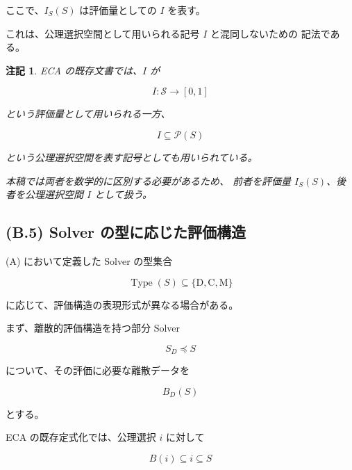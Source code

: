 \documentclass[a4paper,11pt]{article}
\newtheorem{remark}[definition]{注記}
\newcommand{\Solver}{\mathcal{S}}
\newcommand{\SubSolver}{\preceq}
\newcommand{\Type}{\operatorname{Type}}
\newcommand{\DType}{\mathrm{D}}
\newcommand{\CType}{\mathrm{C}}
\newcommand{\MType}{\mathrm{M}}
\begin{document}
ここで、$I_S(S)$ は評価量としての $I$ を表す。

これは、公理選択空間として用いられる記号 $I$ と混同しないための
記法である。

\begin{remark}
ECA の既存文書では、$I$ が

\begin{equation}
    I:\Solver\to[0,1]
\end{equation}

という評価量として用いられる一方、

\begin{equation}
    I\subseteq\mathcal{P}(S)
\end{equation}

という公理選択空間を表す記号としても用いられている。

本稿では両者を数学的に区別する必要があるため、
前者を評価量 $I_S(S)$、後者を公理選択空間 $I$ として扱う。

\end{remark}


\subsection{(B.5) Solver の型に応じた評価構造}
\label{subsec:B5}

(A) において定義した Solver の型集合

\begin{equation}
    \Type(S)
    \subseteq
    \{
        \DType,\CType,\MType
    \}
\end{equation}

に応じて、評価構造の表現形式が異なる場合がある。

まず、離散的評価構造を持つ部分 Solver

\begin{equation}
    S_D\SubSolver S
\end{equation}

について、その評価に必要な離散データを

\begin{equation}
    B_D(S)
\end{equation}

とする。

ECA の既存定式化では、公理選択 $i$ に対して

\begin{equation}
    B(i)\subseteq i\subseteq S
    \label{eq:B-discrete-subset}
\end{equation}
\end{document}
